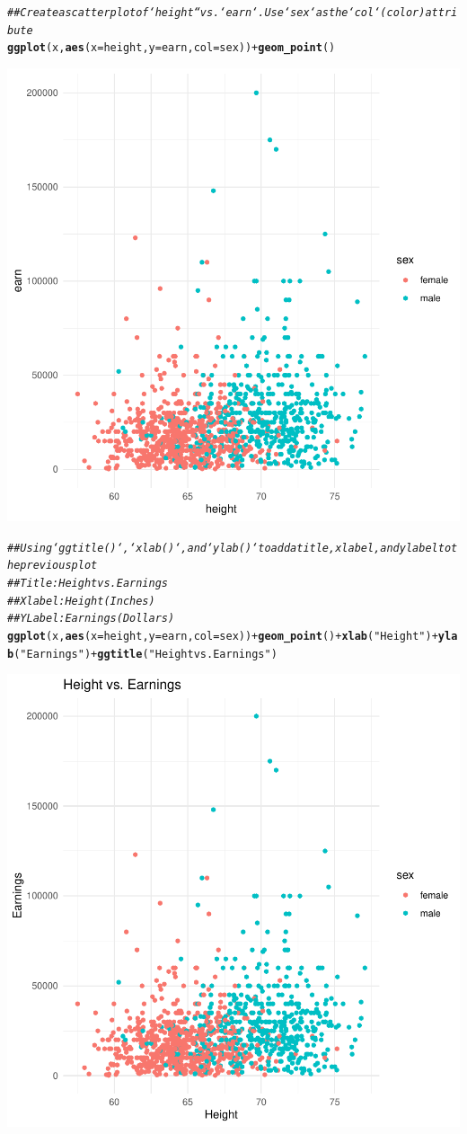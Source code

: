 \documentclass{article}\usepackage[]{graphicx}\usepackage[]{xcolor}
\makeatletter
\newcommand{\hlstr}[1]{\textcolor[rgb]{0.192,0.494,0.8}{#1}}%
\newcommand{\hlcom}[1]{\textcolor[rgb]{0.678,0.584,0.686}{\textit{#1}}}%
\newcommand{\hlopt}[1]{\textcolor[rgb]{0,0,0}{#1}}%
\newcommand{\hlstd}[1]{\textcolor[rgb]{0.345,0.345,0.345}{#1}}%
\newcommand{\hlkwc}[1]{\textcolor[rgb]{0.333,0.667,0.333}{#1}}%
\newcommand{\hlkwd}[1]{\textcolor[rgb]{0.737,0.353,0.396}{\textbf{#1}}}%
\newenvironment{kframe}{%
 \def\at@end@of@kframe{}%
 \ifinner\ifhmode%
  \def\at@end@of@kframe{\end{minipage}}%
  \begin{minipage}{\columnwidth}%
 \fi\fi%
 \def\FrameCommand##1{\hskip\@totalleftmargin \hskip-\fboxsep
 \colorbox{shadecolor}{##1}\hskip-\fboxsep
     \hskip-\linewidth \hskip-\@totalleftmargin \hskip\columnwidth}%
 \MakeFramed {\advance\hsize-\width
   \@totalleftmargin\z@ \linewidth\hsize
   \@setminipage}}%
 {\par\unskip\endMakeFramed%
 \at@end@of@kframe}
\newenvironment{knitrout}{}{} %
\makeatother
\begin{document}
\begin{knitrout}
{}


\begin{kframe}\begin{alltt}
\hlcom{## Create a scatterplot of `height`` vs. `earn`.  Use `sex` as the `col` (color) attribute}
\hlkwd{ggplot}\hlstd{(x,} \hlkwd{aes}\hlstd{(}\hlkwc{x}\hlstd{=height,} \hlkwc{y}\hlstd{=earn,} \hlkwc{col}\hlstd{=sex))} \hlopt{+} \hlkwd{geom_point}\hlstd{()}
\end{alltt}
\end{kframe}

{\centering \includegraphics[width=.6\linewidth]{figure/assignment-03-SyversonLuke-Rnwauto-report-7} 

}


\begin{kframe}\begin{alltt}
\hlcom{## Using `ggtitle()`, `xlab()`, and `ylab()` to add a title, x label, and y label to the previous plot}
\hlcom{## Title: Height vs. Earnings}
\hlcom{## X label: Height (Inches)}
\hlcom{## Y Label: Earnings (Dollars)}
\hlkwd{ggplot}\hlstd{(x,} \hlkwd{aes}\hlstd{(}\hlkwc{x}\hlstd{=height,} \hlkwc{y}\hlstd{=earn,} \hlkwc{col}\hlstd{=sex))} \hlopt{+} \hlkwd{geom_point}\hlstd{()} \hlopt{+} \hlkwd{xlab}\hlstd{(}\hlstr{"Height"}\hlstd{)} \hlopt{+} \hlkwd{ylab}\hlstd{(}\hlstr{"Earnings"}\hlstd{)} \hlopt{+} \hlkwd{ggtitle}\hlstd{(}\hlstr{"Height vs. Earnings"}\hlstd{)}
\end{alltt}
\end{kframe}

{\centering \includegraphics[width=.6\linewidth]{figure/assignment-03-SyversonLuke-Rnwauto-report-8} 

}
\end{knitrout}
\end{document}

